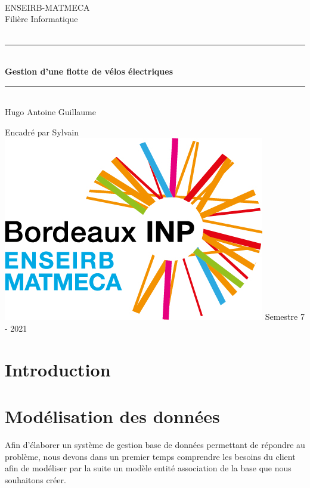 \documentclass[10pt]{article}
\begin{document}
  \begin{titlepage}
    ~ \vfill
    \begin{center}
      \LARGE ENSEIRB-MATMECA\\ \LARGE Filière Informatique\\[1.5 cm]

      {\Large \bfseries {}}\\[0.5 cm]

      \rule{\linewidth}{0.5 mm}\\[0.4 cm] {\Huge \bfseries Gestion d'une flotte de vélos électriques\\[0.2 cm]} \rule{\linewidth}{0.5 mm}\\[1.5 cm] {\Large
      Hugo  \quad Antoine  \quad Guillaume  \\[0.5 cm]}

      {\large Encadré par Sylvain }\\ \vfill
      \includegraphics[scale=0.4]{img/logo.em-bxinp} \vfill
      {\large Semestre 7 - 2021}
    \end{center}
  \end{titlepage}

  \tableofcontents
  \newpage

  \section{Introduction}\label{sec:intro}
  \section{Modélisation des données}\label{sec:modelisation}
  Afin d'élaborer un système de gestion base de données permettant de répondre au problème, nous devons dans un premier temps
  comprendre les besoins du client afin de modéliser par la suite un modèle entité association de la base que nous souhaitons créer.\\
\end{document}
